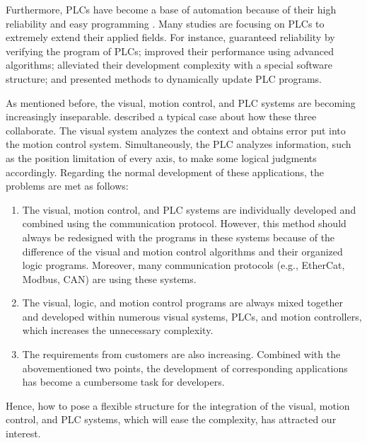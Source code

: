 \documentclass[journal,UTF8]{IEEEtran}
\begin{document}
	Furthermore, PLCs have become a base of automation because of their high reliability and easy programming \cite{Hossain2014Advanced}. Many studies are focusing on PLCs to extremely extend their applied fields. For instance, \cite{Jiang2013System} guaranteed reliability by verifying the program of PLCs; \cite{Dominic2016PLC} improved their performance using advanced algorithms; \cite{wu2018customized} alleviated their development complexity with a special software structure; and \cite{Sch2013Development} presented methods to dynamically update PLC programs.
	
	
	As mentioned before, the visual, motion control, and PLC systems are becoming increasingly inseparable. \cite{Chen2014A} described a typical case about how these three collaborate. The visual system analyzes the context and obtains error put into the motion control system. Simultaneously, the PLC analyzes information, such as the position limitation of every axis, to make some logical judgments accordingly. Regarding the normal development of these applications, the problems are met as follows:
	\begin{enumerate}
		\item The visual, motion control, and PLC systems are individually developed and combined using the communication protocol. However, this method should always be redesigned with the programs in these systems because of the difference of the visual and motion control algorithms and their organized logic programs. Moreover, many communication protocols (e.g., EtherCat, Modbus, CAN) are using these systems.
		\item The visual, logic, and motion control programs are always mixed together and developed within numerous visual systems, PLCs, and motion controllers, which increases the unnecessary complexity. 
		\item The requirements from customers are also increasing. Combined with the abovementioned two points, the development of corresponding applications has become a cumbersome task for developers. 
	\end{enumerate}
	
	Hence, how to pose a flexible structure for the integration of the visual, motion control, and PLC systems, which will ease the complexity, has attracted our interest.
\end{document}
